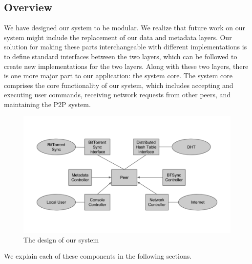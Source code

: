 \documentclass[12pt]{report}
\begin{document}
\subsection{Overview} \label{subsec:Overview_sec:SystemDesign_chap:Implementation}
We have designed our system to be modular. We realize that future work on our system might include the replacement of our data and metadata layers. Our solution for making these parts interchangeable with different implementations is to define standard interfaces between the two layers, which can be followed to create new implementations for the two layers. Along with these two layers, there is one more major part to our application: the system core. The system core comprises the core functionality of our system, which includes accepting and executing user commands, receiving network requests from other peers, and maintaining the P2P system.

\begin{figure} \label{fig:SystemDesign}
  \centering
  \includegraphics[scale=0.4]{SystemDesign}
  \caption{The design of our system}
\end{figure}

We explain each of these components in the following sections.
\end{document}
